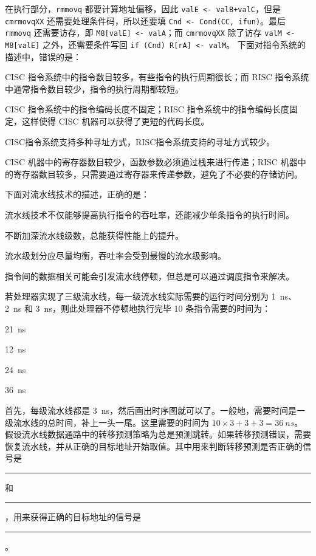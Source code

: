 \begin{problems}
        在执行部分，\verb|rmmovq| 都要计算地址偏移，因此 \verb|valE <- valB+valC|，但是 \verb|cmrmovqXX| 还需要处理条件码，所以还要填 \verb|Cnd <- Cond(CC, ifun)|。最后 \verb|rmmovq| 还需要访存，即 \verb|M8[valE] <- valA|；而 \verb|cmrmovqXX| 除了访存 \verb|valM <- M8[valE]| 之外，还需要条件写回 \verb|if (Cnd) R[rA] <- valM|。
         下面对指令系统的描述中，错误的是：
        \begin{choices}
            \item CISC 指令系统中的指令数目较多，有些指令的执行周期很长；而 RISC 指令系统中通常指令数目较少，指令的执行周期都较短。
            \item CISC 指令系统中的指令编码长度不固定；RISC 指令系统中的指令编码长度固定，这样使得 CISC 机器可以获得了更短的代码长度。
            \item CISC指令系统支持多种寻址方式，RISC指令系统支持的寻址方式较少。
            \item CISC 机器中的寄存器数目较少，函数参数必须通过栈来进行传递；RISC 机器中的寄存器数目较多，只需要通过寄存器来传递参数，避免了不必要的存储访问。
        \end{choices}
         下面对流水线技术的描述，正确的是：
        \begin{choices}
            \item 流水线技术不仅能够提高执行指令的吞吐率，还能减少单条指令的执行时间。
            \item 不断加深流水线级数，总能获得性能上的提升。
            \item 流水级划分应尽量均衡，吞吐率会受到最慢的流水级影响。
            \item 指令间的数据相关可能会引发流水线停顿，但总是可以通过调度指令来解决。
        \end{choices}
         若处理器实现了三级流水线，每一级流水线实际需要的运行时间分别为 \SI{1}{ns}、\SI{2}{ns} 和 \SI{3}{ns}，则此处理器不停顿地执行完毕 10 条指令需要的时间为：
        \begin{choices}
            \item \SI{21}{ns}
            \item \SI{12}{ns}
            \item \SI{24}{ns}
            \item \SI{36}{ns}
        \end{choices}
        \sol 首先，每级流水线都是 \SI{3}{ns}，然后画出时序图就可以了。一般地，需要时间是一级流水线的总时间，补上一头一尾。这里需要的时间为 $10 \times 3+3+3 = \SI{36}{ns}$。
         假设流水线数据通路中的转移预测策略为总是预测跳转。如果转移预测错误，需要恢复流水线，并从正确的目标地址开始取值。其中用来判断转移预测是否正确的信号是 \rule{2.5cm}{0.25mm} 和 \rule{2.5cm}{0.25mm}，用来获得正确的目标地址的信号是 \rule{2.5cm}{0.25mm}。

\end{problems}
